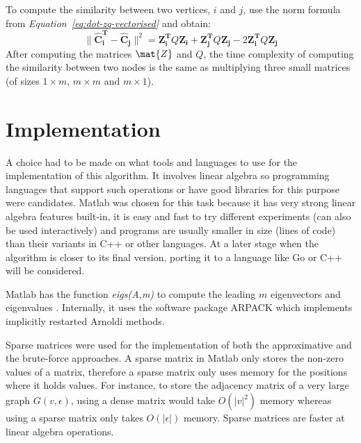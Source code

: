\documentclass[12pt]{report}
\begin{document}
To compute the similarity between two vertices, $i$ and $j$, use the norm formula
from \emph{Equation~\ref{eq:dot-zq-vectorised}} and obtain:
%
\begin{equation}
\|\mathbf{\hat{C}_i^T} - \mathbf{\hat{C}_j}\|^2 = \mathbf{Z_i^T} Q \mathbf{Z_i} + \mathbf{Z_j^T} Q \mathbf{Z_j} - 2 \mathbf{Z_i^T} Q \mathbf{Z_j}
\end{equation}
%
After computing the matrices $\mat{Z}$ and $Q$, the time complexity of computing the
similarity between two nodes is the same as multiplying three small matrices
(of sizes $1 \times m$, $m \times m$ and $m \times 1$).


%
\section{Implementation}
%
A choice had to be made on what tools and languages to use for the implementation
of this algorithm. It involves linear algebra so programming languages that support
such operations or have good libraries for this purpose were candidates. Matlab
was chosen for this task because it has very strong linear algebra features built-in,
it is easy and fast to try different experiments (can also be used interactively)
and programs are usually smaller in size (lines of code) than their variants in C++
or other languages. At a later stage when the algorithm is closer to its final
version, porting it to a language like Go or C++ will be considered.


Matlab has the function \textit{eigs(A,m)} to compute the leading $m$ eigenvectors
and eigenvalues \cite{matlab:eigs}. Internally, it uses the software package ARPACK which implements
implicitly restarted Arnoldi methods. \cite{lehoucq1998arpack}


Sparse matrices were used for the implementation of both the approximative and
the brute-force approaches. A sparse matrix in Matlab only stores the non-zero
values of a matrix, therefore a sparse matrix only uses memory for the positions
where it holds values\cite{gilbert1992sparse}. For instance, to store the adjacency matrix of a very
large graph $G(v,\epsilon)$, using a dense matrix would take $O(|v|^2)$ memory
whereas using a sparse matrix only takes $O(|\epsilon|)$ memory. Sparse matrices
are faster at linear algebra operations.
\end{document}
